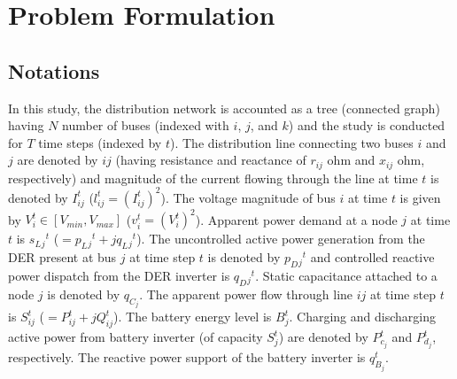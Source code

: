 \documentclass{article}
\begin{document}
\section{Problem Formulation}

\subsection{Notations}
In this study, the distribution network is accounted as a tree (connected graph) having \(N\) number of buses (indexed with \(i\), \(j\), and \(k\)) and the study is conducted for \(T\) time steps (indexed by \(t\)). The distribution line connecting two buses \(i\) and \(j\) are denoted by {\(ij\)} (having resistance and reactance of \(r_{ij}\) ohm and \(x_{ij}\) ohm, respectively) and magnitude of the current flowing through the line at time \(t\) is denoted by \(I_{ij}^t\) (\(l_{ij}^t=\left(I_{ij}^t\right)^2\)). The voltage magnitude of bus \(i\) at time \(t\) is given by \(V_i^t \in [V_{min},V_{max}]\) (\(v_i^t=\left(V_i^t\right)^2\)). Apparent power demand at a node \(j\) at time \(t\) is \(s_L{_j}^t\) (\(=p_L{_j}^t+\textit{j}q_L{_j}^t\)). The uncontrolled active power generation from the DER present at bus \(j\) at time step \(t\) is denoted by \(p_D{_j}^t\) and controlled reactive power dispatch from the DER inverter is \(q_D{_j}^t\). Static capacitance attached to a node $j$ is denoted by $q_{C_{j}}$. The apparent power flow through line {\(ij\)} at time step \(t\) is \(S_{ij}^t\) (\(=P_{ij}^t+\textit{j}Q_{ij}^t\)). The battery energy level is \(B_j^t\). Charging and discharging active power from battery inverter (of capacity \(S_j^t\)) are denoted by \(P_{c_j}^t\) and \(P_{d_j}^t\), respectively. The reactive power support of the battery inverter is \(q_{B_j}^t\).
\end{document}

